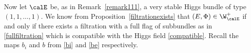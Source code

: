 



Now let $\calE$ be, as in Remark~\ref{remark111}, a very stable Higgs bundle of type $(1,1,\dots,1)$. We know from Proposition~\ref{filtrationexists} that $(E,\Phi)\in \W^+_{\calE}$ if and only if there exists a filtration with a full flag of subbundles as in \eqref{fullfiltration} which is compatible with the Higgs field \eqref{compatible}. Recall the maps $b_i$ and $b$ from \eqref{bi} and \eqref{be} respectively.

